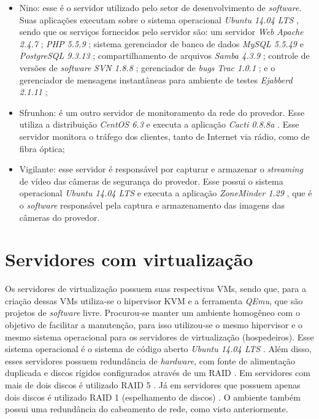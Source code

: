 \begin{itemize}
 \item Nino: esse é o servidor utilizado pelo setor de desenvolvimento de \textit{software}. Suas aplicações executam sobre o sistema operacional 
 \textit{Ubuntu 14.04 \ac{LTS}} \cite{ubuntu}, sendo que os serviços fornecidos pelo servidor são: um servidor \textit{Web} \textit{Apache 2.4.7} 
 \cite{apache}; \textit{\ac{PHP} 5.5.9} \cite{php}; sistema gerenciador de banco de dados \textit{MySQL 5.5.49} \cite{mysql} e 
 \textit{PostgreSQL 9.3.13} \cite{postgres}; compartilhamento de arquivos \textit{Samba 4.3.9} \cite{samba}; controle de versões de 
 \textit{software} \textit{\ac{SVN} 1.8.8} \cite{svn}; gerenciador de \textit{bugs} \textit{Trac 1.0.1} \cite{trac}; e o gerenciador de 
 mensagens instantâneas para ambiente de testes \textit{Ejabberd 2.1.11} \cite{ejabberd};
 
 \item Sfrunhon: é um outro servidor de monitoramento da rede do provedor. Esse utiliza a distribuição \textit{CentOS 6.3} \cite{centos} e executa 
 a aplicação \textit{Cacti 0.8.8a} \cite{cacti}. Esse servidor monitora o tráfego dos clientes, tanto de Internet via rádio, como de 
 fibra óptica;
 
 \item Vigilante: esse servidor é responsável por capturar e armazenar o \textit{streaming} de vídeo das câmeras de segurança do provedor. 
 Esse possui o sistema operacional \textit{Ubuntu 14.04 \ac{LTS}} \cite{ubuntu} e executa a aplicação \textit{ZoneMinder 1.29} \cite{zoneminder}, 
 que é o \textit{software} responsável pela captura e armazenamento das imagens das câmeras do provedor.
\end{itemize}

\section{Servidores com virtualização}
\label{section:servvirt}

Os servidores de virtualização possuem suas respectivas \ac{VM}s, sendo que, para a criação dessas \ac{VM}s utiliza-se o hipervisor \ac{KVM} e a 
ferramenta \textit{QEmu}, que são projetos de \textit{software} livre. Procurou-se manter um ambiente homogêneo com o objetivo de facilitar a 
manutenção, para isso utilizou-se o mesmo hipervisor e o mesmo sistema operacional para os servidores de virtualização (hospedeiros). 
Esse sistema operacional é o sistema de código aberto \textit{Ubuntu 14.04 \ac{LTS}} \cite{ubuntu}.
Além disso, esses servidores possuem redundância de \textit{hardware}, com fonte de alimentação duplicada e discos rígidos configurados através de 
um \ac{RAID} \cite{raid}. Em servidores com mais de dois discos é utilizado \ac{RAID} 5 \cite{raid}. Já em servidores que possuem apenas dois 
discos é utilizado \ac{RAID} 1 (espelhamento de discos) \cite{raid}. O ambiente também possui uma redundância do cabeamento de rede, 
como visto anteriormente.

